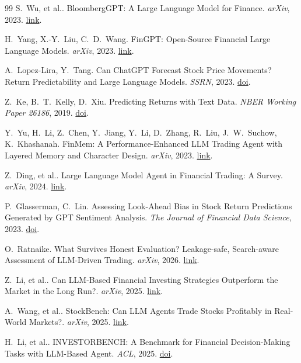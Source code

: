 \begin{thebibliography}{99}
 S.~Wu, et al.. BloombergGPT: A Large Language Model for Finance. \emph{arXiv}, 2023. \href{https://arxiv.org/abs/2303.17564}{link}.

 H.~Yang, X.-Y.~Liu, C.~D.~Wang. FinGPT: Open-Source Financial Large Language Models. \emph{arXiv}, 2023. \href{https://arxiv.org/abs/2306.06031}{link}.

 A.~Lopez-Lira, Y.~Tang. Can ChatGPT Forecast Stock Price Movements? Return Predictability and Large Language Models. \emph{SSRN}, 2023. \href{https://doi.org/10.2139/ssrn.4412788}{doi}.

 Z.~Ke, B.~T.~Kelly, D.~Xiu. Predicting Returns with Text Data. \emph{NBER Working Paper 26186}, 2019. \href{https://doi.org/10.3386/w26186}{doi}.

 Y.~Yu, H.~Li, Z.~Chen, Y.~Jiang, Y.~Li, D.~Zhang, R.~Liu, J.~W.~Suchow, K.~Khashanah. FinMem: A Performance-Enhanced LLM Trading Agent with Layered Memory and Character Design. \emph{arXiv}, 2023. \href{https://arxiv.org/abs/2311.13743}{link}.

 Z.~Ding, et al.. Large Language Model Agent in Financial Trading: A Survey. \emph{arXiv}, 2024. \href{https://arxiv.org/abs/2408.06361}{link}.

 P.~Glasserman, C.~Lin. Assessing Look-Ahead Bias in Stock Return Predictions Generated by GPT Sentiment Analysis. \emph{The Journal of Financial Data Science}, 2023. \href{https://doi.org/10.3905/jfds.2023.1.143}{doi}.

 O.~Ratnaike. What Survives Honest Evaluation? Leakage-safe, Search-aware Assessment of LLM-Driven Trading. \emph{arXiv}, 2026. \href{https://arxiv.org/abs/2608.27734}{link}.

 Z.~Li, et al.. Can LLM-Based Financial Investing Strategies Outperform the Market in the Long Run?. \emph{arXiv}, 2025. \href{https://arxiv.org/abs/2505.07078}{link}.

 A.~Wang, et al.. StockBench: Can LLM Agents Trade Stocks Profitably in Real-World Markets?. \emph{arXiv}, 2025. \href{https://arxiv.org/abs/2510.02209}{link}.

 H.~Li, et al.. INVESTORBENCH: A Benchmark for Financial Decision-Making Tasks with LLM-Based Agent. \emph{ACL}, 2025. \href{https://doi.org/10.18653/v1/2025.acl-long.126}{doi}.


\end{thebibliography}
